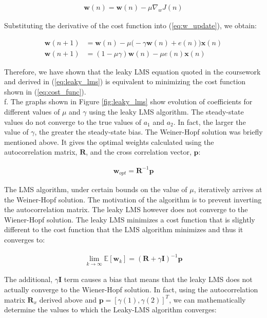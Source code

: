 \begin{align}
\textbf{w}(n) = \textbf{w}(n) - \mu \nabla_{w}J(n) \label{eq:w_update}
\end{align}

\noindent{}Substituting the derivative of the cost function into (\ref{eq:w_update}), we obtain:

\begin{align}
\textbf{w}(n+1) &= \textbf{w}(n) - \mu \Bigg(-\gamma \textbf{w}(n) + e(n)\Bigg)\textbf{x}(n) \nonumber\\
\textbf{w}(n+1) &= (1-\mu\gamma)\textbf{w}(n) - \mu e(n)\textbf{x}(n) \label{eq:leaky_lms}
\end{align}

\noindent{}Therefore, we have shown that the leaky LMS equation quoted in the coursework and derived in (\ref{eq:leaky_lms}) is equivalent to minimizing the cost function shown in (\ref{eq:cost_func}).\\

\noindent{}f. The graphs shown in Figure \ref{fig:leaky_lms} show evolution of coefficients for different values of $\mu$ and $\gamma$ using the leaky LMS algorithm. The steady-state values do not converge to the true values of $a_1$ and $a_2$. In fact, the larger the value of $\gamma$, the greater the steady-state bias. The Weiner-Hopf solution was briefly mentioned above. It gives the optimal weights calculated using the autocorrelation matrix, $\textbf{R}$, and the cross correlation vector, $\textbf{p}$:

\begin{align*}
\textbf{w}_{opt} = \textbf{R}^{-1}\textbf{p}
\end{align*}

\noindent{}The LMS algorithm, under certain bounds on the value of $\mu$, iteratively arrives at the Weiner-Hopf solution. The motivation of the algorithm is to prevent inverting the autocorrelation matrix. The leaky LMS however does not converge to the Wiener-Hopf solution. The leaky LMS minimizes a cost function that is slightly different to the cost function that the LMS algorithm minimizes and thus it converges to:

\begin{align*}
\lim_{k \rightarrow \infty} \mathbb{E}[\textbf{w}_{k}] = (\textbf{R} + \gamma\textbf{I})^{-1}\textbf{p}
\end{align*}

\noindent{}The additional, $\gamma\textbf{I}$ term causes a bias that means that the leaky LMS does not actually converge to the Wiener-Hopf solution. In fact, using the autocorrelation matrix $\textbf{R}_x$ derived above and  $\textbf{p} = [\gamma(1), \gamma(2)]^T$, we can mathematically determine the values to which the Leaky-LMS algorithm converges:

